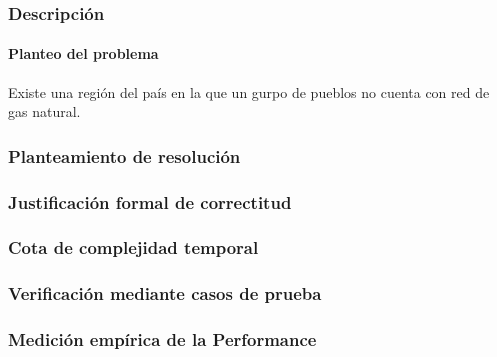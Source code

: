\documentclass[11pt, a4paper, twoside]{article}
\begin{document}
{}

\subsubsection{Descripción}\label{subsubsec:ej2-descripcion}

\paragraph*{Planteo del problema}
  Existe una región del país en la que un gurpo de pueblos no cuenta con 
  red de gas natural.

\subsubsection{Planteamiento de resolución}\label{subsubsec:ej2-resolucion}


\subsubsection{Justificación formal de correctitud}\label{subsubsec:ej2-correctitud}


\subsubsection{Cota de complejidad temporal}\label{subsubsec:ej2-cotatemporal}


\subsubsection{Verificación mediante casos de prueba}\label{subsubsec:ej2-casosdeprueba}


\subsubsection{Medición empírica de la Performance}\label{subsubsec:ej2-performance}

\end{document}
